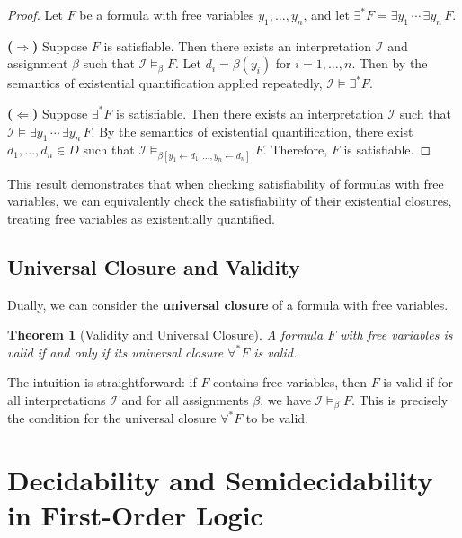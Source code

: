\documentclass[11pt,a4paper]{article}
\theoremstyle{definition}
\theoremstyle{plain}
\newtheorem{theorem}{Theorem}[section]
\theoremstyle{remark}
\begin{document}
\begin{proof}
Let $F$ be a formula with free variables $y_1, \dots, y_n$, and let $\exists^* F = \exists y_1 \, \cdots \, \exists y_n \, F$.

\textbf{($\Rightarrow$)} Suppose $F$ is satisfiable. Then there exists an interpretation $\mathcal{I}$ and assignment $\beta$ such that $\mathcal{I} \models_\beta F$. Let $d_i = \beta(y_i)$ for $i = 1, \dots, n$. Then by the semantics of existential quantification applied repeatedly, $\mathcal{I} \models \exists^* F$.

\textbf{($\Leftarrow$)} Suppose $\exists^* F$ is satisfiable. Then there exists an interpretation $\mathcal{I}$ such that $\mathcal{I} \models \exists y_1 \, \cdots \, \exists y_n \, F$. By the semantics of existential quantification, there exist $d_1, \dots, d_n \in D$ such that $\mathcal{I} \models_{\beta[y_1 \leftarrow d_1, \dots, y_n \leftarrow d_n]} F$. Therefore, $F$ is satisfiable.
\end{proof}

This result demonstrates that when checking satisfiability of formulas with free variables, we can equivalently check the satisfiability of their existential closures, treating free variables as existentially quantified.

\subsection{Universal Closure and Validity}

Dually, we can consider the \textbf{universal closure} of a formula with free variables.

\begin{theorem}[Validity and Universal Closure]
A formula $F$ with free variables is valid if and only if its universal closure $\forall^* F$ is valid.
\end{theorem}

The intuition is straightforward: if $F$ contains free variables, then $F$ is valid if for all interpretations $\mathcal{I}$ and for all assignments $\beta$, we have $\mathcal{I} \models_\beta F$. This is precisely the condition for the universal closure $\forall^* F$ to be valid.

\newpage

\section{Decidability and Semidecidability in First-Order Logic}
\end{document}
